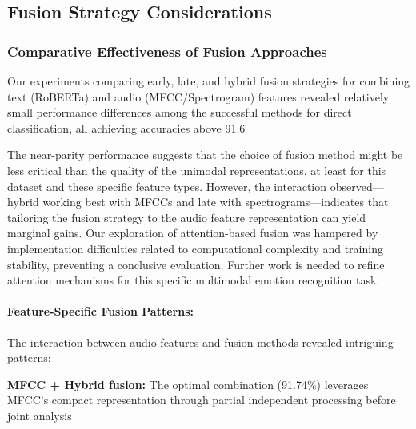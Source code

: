\documentclass[12pt]{article}
\begin{document}
\subsection{Fusion Strategy Considerations}

\subsubsection{Comparative Effectiveness of Fusion Approaches}
Our experiments comparing early, late, and hybrid fusion strategies for combining text (RoBERTa) and audio (MFCC/Spectrogram) features revealed relatively small performance differences among the successful methods for direct classification, all achieving accuracies above 91.6%

The near-parity performance suggests that the choice of fusion method might be less critical than the quality of the unimodal representations, at least for this dataset and these specific feature types. However, the interaction observed—hybrid working best with MFCCs and late with spectrograms—indicates that tailoring the fusion strategy to the audio feature representation can yield marginal gains. Our exploration of attention-based fusion was hampered by implementation difficulties related to computational complexity and training stability, preventing a conclusive evaluation. Further work is needed to refine attention mechanisms for this specific multimodal emotion recognition task.

\paragraph{Feature-Specific Fusion Patterns:}
The interaction between audio features and fusion methods revealed intriguing patterns:

    \textbf{MFCC + Hybrid fusion:} The optimal combination (91.74\%) leverages MFCC's compact representation through partial independent processing before joint analysis
    
\end{document}
